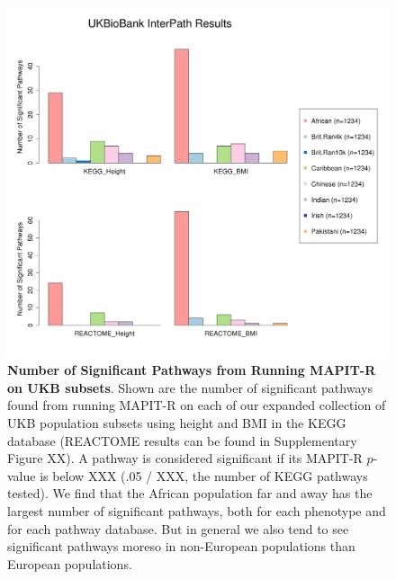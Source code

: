 \documentclass[12pt, a4paper]{article}
\begin{document}
\begin{figure}[htbp]
\centering
\includegraphics[scale=.35]{Images/Supp/InterPath_Supp_Figure_Barplots_vs1.png}
\caption[TBD]{\textbf{Number of Significant Pathways from Running MAPIT-R on UKB subsets}. Shown are the number of significant pathways found from running MAPIT-R on each of our expanded collection of UKB population subsets using height and BMI in the KEGG database (REACTOME results can be found in Supplementary Figure XX). A pathway is considered significant if its MAPIT-R $p$-value is below XXX (.05 / XXX, the number of KEGG pathways tested). We find that the African population far and away has the largest number of significant pathways, both for each phenotype and for each pathway database. But in general we also tend to see significant pathways moreso in non-European populations than European populations.}
\label{InterPath-Supp-Figure-Barplots-All}
\end{figure}
\clearpage
\end{document}
